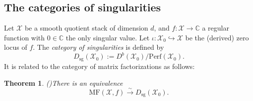 \documentclass [11pt,oneside,a4paper,mathscr]{amsart}
\newtheorem{thm}{Theorem}[section]
\theoremstyle{definition}
\newcommand{\X}{\mathscr{X}}
\begin{document}
\subsection{The categories of singularities}
Let $\mathscr{X}$ be a smooth quotient stack of dimension $d$, and $f\colon \mathscr{X}\to\mathbb{C}$ a regular function with $0 \in \mathbb{C}$ the only singular value. Let $\iota\colon \X_0\hookrightarrow \X$ be the (derived) zero locus of $f$. 
The \textit{category of singularities} is defined by 
\begin{equation}\label{sg}
D_{\mathrm{sg}}(\mathscr{X}_0):=D^b(\mathscr{X}_0)/\text{Perf}(\mathscr{X}_0). 
\end{equation}
It is related to the category of matrix factorizations 
as follows: 
\begin{thm}\emph{(\cite{o2, EfPo})}\label{thm:orlov}
There is an equivalence
\begin{equation}\label{dsgmf}
\mathrm{MF}(\X, f)\stackrel{\sim}{\to} D_{\mathrm{sg}}(\mathscr{X}_0).
\end{equation}
\end{thm}
\end{document}
